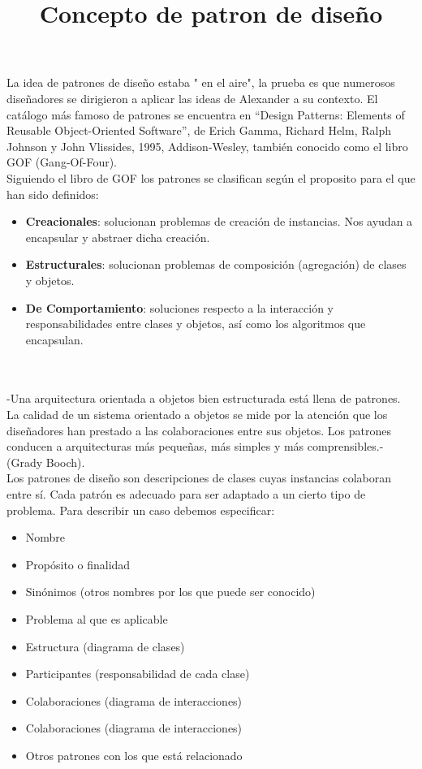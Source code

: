\documentclass[a4paper,10pt]{report}
\begin{document}
La idea de patrones de diseño estaba " en el aire", la prueba es que numerosos diseñadores se dirigieron a aplicar las ideas de Alexander a su contexto. El catálogo más famoso de patrones se encuentra en “Design Patterns: Elements of Reusable Object-Oriented Software”, de Erich Gamma, Richard Helm, Ralph Johnson y John Vlissides, 1995, Addison-Wesley, también conocido como el libro GOF (Gang-Of-Four).\\

Siguiendo el libro de GOF los patrones se clasifican según el proposito para el que han sido definidos:\\

\begin{itemize}
    \item{\textbf{Creacionales}: solucionan problemas de creación de instancias. Nos ayudan a encapsular y abstraer dicha creación.\\}
    \item{\textbf{Estructurales}: solucionan problemas de composición (agregación) de clases y objetos.\\
}
    \item{\textbf{De Comportamiento}: soluciones respecto a la interacción y responsabilidades entre clases y objetos, así como los algoritmos que encapsulan. \\
}
\end{itemize}


\title{\textbf{Concepto de patron de diseño}}\\
\\-Una arquitectura orientada a objetos bien estructurada está llena de patrones. La calidad de un sistema orientado a objetos se mide por la atención que los diseñadores han prestado a las colaboraciones entre sus objetos. Los patrones conducen a arquitecturas más pequeñas, más simples y más comprensibles.- (Grady Booch).\\
Los patrones de diseño son descripciones de clases cuyas instancias colaboran entre sí. Cada patrón es adecuado para ser adaptado a un cierto tipo de problema. Para describir un caso debemos especificar:
\begin{itemize}
    \item{Nombre}
    \item{Propósito o finalidad }
    \item{Sinónimos (otros nombres por los que puede ser conocido) }
    \item{Problema al que es aplicable }
    \item{Estructura (diagrama de clases) }
    \item{Participantes (responsabilidad de cada clase) }
    \item{Colaboraciones (diagrama de interacciones) }
    \item{Colaboraciones (diagrama de interacciones) }
    \item{Otros patrones con los que está relacionado\\ }
\end{itemize}
\end{document}
